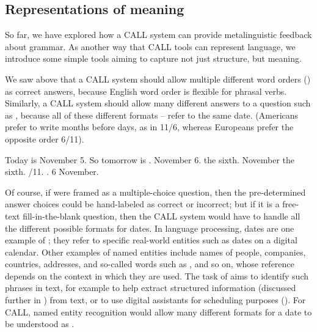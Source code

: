 


\subsection{Representations of meaning}

So far, we have explored how a CALL system can provide metalinguistic feedback about grammar. As another way that CALL tools can represent language, we introduce some simple tools aiming to capture not just structure, but meaning.

We saw above that a CALL system should allow multiple different word orders () as correct answers, because English word order is flexible for phrasal verbs.  Similarly, a CALL system should allow many different answers to a question such as , because all of these different formats -- refer to the same date.  (Americans prefer to write months before days, as in 11/6, whereas Europeans prefer the opposite order 6/11).

\ea \label{ex:november}Today is November 5. So tomorrow is \uline{\hspace{3cm}}. 
    \ea  \label{nov1} November 6.
    \ex the sixth.
    \ex  November the sixth.
    /11.
    .
    \ex \label{novend} 6 November.
\z 
\z 


Of course, if  were framed as a multiple-choice question, then the pre-determined answer choices could be hand-labeled as correct or incorrect; but if it is a free-text fill-in-the-blank question, then the CALL system would have to handle all the different possible formats for dates.  In language processing, dates are one example of ; they refer to specific real-world entities such as dates on a digital calendar. Other examples of named entities include names of people, companies, countries, addresses, and so-called  words such as , and so on, whose reference depends on the context in which they are used. The task of  aims to identify such phrases in text, for example to help extract structured information (discussed further in ) from text, or to use digital assistants for scheduling purposes ().  For CALL, named entity recognition would allow many different formats for a date to be understood as .


